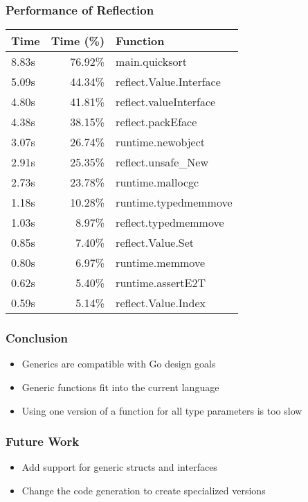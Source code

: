 \documentclass[12pt]{beamer}
\begin{document}

\begin{frame}[fragile]
\frametitle{Performance of Reflection}
\centering
\begin{table}
\begin{tabular}{lrl}
Time & Time (\%{}) & Function \\
\hline
8.83s & 76.92\%{} & main.quicksort \\
5.09s & 44.34\%{} & reflect.Value.Interface \\
4.80s & 41.81\%{} & reflect.valueInterface \\
4.38s & 38.15\%{} & reflect.packEface \\
3.07s & 26.74\%{} & runtime.newobject \\
2.91s & 25.35\%{} & reflect.unsafe\_{}New \\
2.73s & 23.78\%{} & runtime.mallocgc \\
1.18s & 10.28\%{} & runtime.typedmemmove \\
1.03s & 8.97\%{} & reflect.typedmemmove \\
0.85s & 7.40\%{} & reflect.Value.Set \\
0.80s & 6.97\%{} & runtime.memmove \\
0.62s & 5.40\%{} & runtime.assertE2T \\
0.59s & 5.14\%{} & reflect.Value.Index \\
\end{tabular}
\end{table}
\end{frame}


\begin{frame}[fragile]
\frametitle{Conclusion}
\begin{itemize}
\item Generics are compatible with Go design goals
\item Generic functions fit into the current language
\item Using one version of a function for all type parameters is too slow
\end{itemize}
\end{frame}


\begin{frame}[fragile]
\frametitle{Future Work}
\begin{itemize}
\item Add support for generic structs and interfaces
\item Change the code generation to create specialized versions
\end{itemize}
\end{frame}
\end{document}
